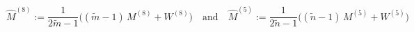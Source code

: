 \begin{equation}
\hat{M}^{(8)} := \frac{1}{2\tilde{m}-1}\Big((\tilde{m}-1)\, M^{(8)} + W^{(8)}\Big)\quad \text{and}\quad
\hat{M}^{(5)} := \frac{1}{2\tilde{n}-1}\Big((\tilde{n}-1)\, M^{(5)} + W^{(5)}\Big)
\end{equation}

